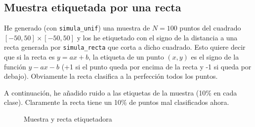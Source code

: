 \documentclass[a4]{article}
\begin{document}
\subsection{Muestra etiquetada por una recta}

He generado (con \texttt{simula\_unif}) una muestra de $N=100$ puntos
del cuadrado $[-50,50]\times[-50,50]$ y los he etiquetado con
el signo de la distancia a una recta generada por \texttt{simula\_recta} que corta a dicho cuadrado.
Esto quiere decir que si la recta es $y=ax+b$, la etiqueta
de un punto $(x,y)$ es el signo de la función $y-ax-b$ (+1 si el punto 
queda por encima de la recta y -1 si queda por debajo).
Obviamente la recta clasifica a la perfección todos los puntos.

A continuación, he añadido ruido a las etiquetas de la muestra
(10\% en cada clase). Claramente la recta tiene un 10\% de puntos mal clasificados ahora.

\vspace{-2mm}

\begin{figure}[H]
    \centering
    \caption{Muestra y recta etiquetadora}
    \label{fig:muestra-ruido}
\end{figure}
\end{document}
